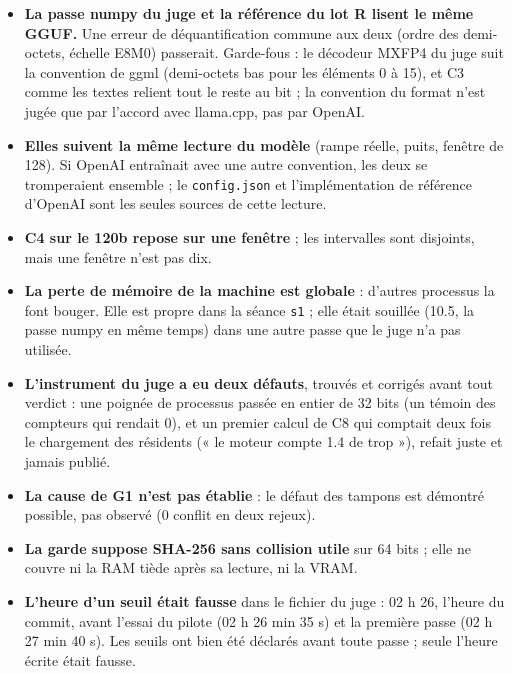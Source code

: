 \begin{faux}\label{t2e-sec:faux}
\begin{itemize}
\item \textbf{La passe numpy du juge et la référence du lot R lisent le même GGUF.} Une erreur de déquantification commune aux deux (ordre des demi-octets, échelle E8M0) passerait. Garde-fous : le décodeur MXFP4 du juge suit la convention de ggml (demi-octets bas pour les éléments 0 à 15), et C3 comme les textes relient tout le reste au bit ; la convention du format n'est jugée que par l'accord avec llama.cpp, pas par OpenAI.
\item \textbf{Elles suivent la même lecture du modèle} (rampe réelle, puits, fenêtre de 128). Si OpenAI entraînait avec une autre convention, les deux se tromperaient ensemble ; le \texttt{config.json} et l'implémentation de référence d'OpenAI sont les seules sources de cette lecture.
\item \textbf{C4 sur le 120b repose sur une fenêtre} ; les intervalles sont disjoints, mais une fenêtre n'est pas dix.
\item \textbf{La perte de mémoire de la machine est globale} : d'autres processus la font bouger. Elle est propre dans la séance \texttt{s1} ; elle était souillée (\SI{10.5}{\Go}, la passe numpy en même temps) dans une autre passe que le juge n'a pas utilisée.
\item \textbf{L'instrument du juge a eu deux défauts}, trouvés et corrigés avant tout verdict : une poignée de processus passée en entier de 32 bits (un témoin des compteurs qui rendait 0), et un premier calcul de C8 qui comptait deux fois le chargement des résidents (« le moteur compte \SI{1.4}{\Go} de trop »), refait juste et jamais publié.
\item \textbf{La cause de G1 n'est pas établie} : le défaut des tampons est démontré possible, pas observé (0 conflit en deux rejeux).
\item \textbf{La garde suppose SHA-256 sans collision utile} sur 64 bits ; elle ne couvre ni la RAM tiède après sa lecture, ni la VRAM.
\item \textbf{L'heure d'un seuil était fausse} dans le fichier du juge :  02 h 26, l'heure du commit, avant l'essai du pilote (02 h 26 min 35 s) et la première passe (02 h 27 min 40 s). Les seuils ont bien été déclarés avant toute passe ; seule l'heure écrite était fausse.
\end{itemize}
\end{faux}
